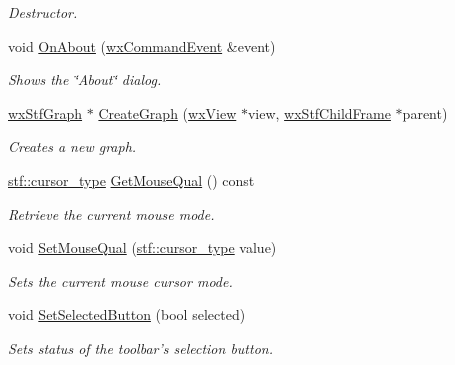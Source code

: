 \begin{DoxyCompactItemize}
\begin{DoxyCompactList}\small\item\em Destructor. \item\end{DoxyCompactList}\item 
void \hyperlink{classwxStfParentFrame_aeccc590cb629c04dcb324dc5489ab9d6}{OnAbout} (\hyperlink{classwxCommandEvent}{wxCommandEvent} \&event)
\begin{DoxyCompactList}\small\item\em Shows the \char`\"{}About\char`\"{} dialog. \item\end{DoxyCompactList}\item 
\hyperlink{classwxStfGraph}{wxStfGraph} $\ast$ \hyperlink{classwxStfParentFrame_a08247ff8b91d51ea1913970626b3be42}{CreateGraph} (\hyperlink{classwxView}{wxView} $\ast$view, \hyperlink{classwxStfChildFrame}{wxStfChildFrame} $\ast$parent)
\begin{DoxyCompactList}\small\item\em Creates a new graph. \item\end{DoxyCompactList}\item 
\hyperlink{group__stfgen_gad2d1acb3ac0c16ee32b5f4d3a1ab4abf}{stf::cursor\_\-type} \hyperlink{classwxStfParentFrame_a0de1400e729ba787f3cfa73f84cd8df3}{GetMouseQual} () const 
\begin{DoxyCompactList}\small\item\em Retrieve the current mouse mode. \item\end{DoxyCompactList}\item 
void \hyperlink{classwxStfParentFrame_a63792d2763391118b1a46d35deeb36b3}{SetMouseQual} (\hyperlink{group__stfgen_gad2d1acb3ac0c16ee32b5f4d3a1ab4abf}{stf::cursor\_\-type} value)
\begin{DoxyCompactList}\small\item\em Sets the current mouse cursor mode. \item\end{DoxyCompactList}\item 
void \hyperlink{classwxStfParentFrame_a983c2f9ceff5238554dc61691d7f83df}{SetSelectedButton} (bool selected)
\begin{DoxyCompactList}\small\item\em Sets status of the toolbar's selection button. \item\end{DoxyCompactList}\item 

\end{DoxyCompactItemize}
